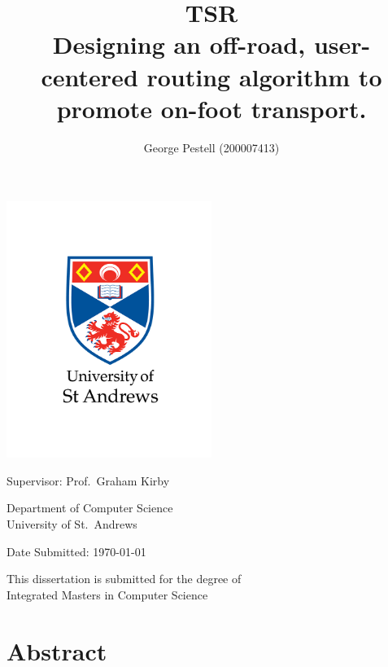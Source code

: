 \documentclass[12pt]{article}
\title{{\huge TSR}\vspace{0.5em}\\
Designing an off-road, user-centered routing algorithm to promote on-foot transport.}
\author{George Pestell (200007413)}
\date{}
\begin{document}
\fancyhead[R]{\thepage}
\fancyfoot{}

\makeatletter
\begin{titlepage}
  \centering

  \vspace*{\fill}

  \textbf{\large{\thetitle}}

  \includegraphics[width=0.5\textwidth]{./assets/01-standard-vertical-black-text.png}

  \textbf{\large{\theauthor}}

  \vspace{0.2cm}

  \large{Supervisor: Prof.\ Graham Kirby}
  \vspace{0.8cm}

  \large{Department of Computer Science\\
    University of St.\ Andrews}

  \large{Date Submitted: \today}

  \vspace{0.8cm}

  \large{This dissertation is submitted for the degree of \\
    Integrated Masters in Computer Science}


  \vspace*{\fill}

\end{titlepage}
\makeatother

\pagebreak
{}

\section*{Abstract}
\end{document}
